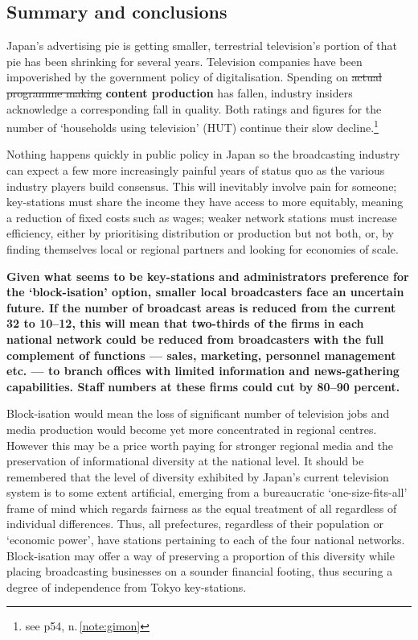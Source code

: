\documentclass[11pt, oneside, a4paper, headsepline]{scrartcl}
\begin{document}
\subsection{Summary and conclusions}

Japan's advertising pie is getting smaller, terrestrial television's portion of that pie has been shrinking for several years. Television companies have been impoverished by the government policy of digitalisation. Spending on \st{actual programme making} \textbf{content production} has fallen, industry insiders acknowledge a corresponding fall in quality. Both ratings and figures for the number of `households using television' (HUT) continue their slow decline.\footnote{see p54, n.\,\ref{note:gimon}} 

Nothing happens quickly in public policy in Japan so the broadcasting industry can expect a few more increasingly painful years of status quo as the various industry players build consensus. This will inevitably involve pain for someone; key-stations must share the income they have access to more equitably, meaning a reduction of fixed costs such as wages; weaker network stations must increase efficiency, either by prioritising distribution or production but not both, or, by finding themselves local or regional partners and looking for economies of scale.

{\bf Given what seems to be key-stations and administrators preference for the `block-isation' option, smaller local broadcasters face an uncertain future. If the number of broadcast areas is reduced from the current 32 to 10--12, this will mean that two-thirds of the firms in each national network could be reduced from broadcasters with the full complement of functions --- sales, marketing, personnel management etc. --- to branch offices with limited information and news-gathering capabilities. Staff numbers at these firms could cut by 80--90 percent.

Block-isation would mean the loss of significant number of television jobs and media production would become yet more concentrated in regional centres. However this may be a price worth paying for stronger regional media and the preservation of informational diversity at the national level. It should be remembered that the level of diversity exhibited by Japan's current television system is to some extent artificial, emerging from a bureaucratic `one-size-fits-all' frame of mind which regards fairness as the equal treatment of all regardless of individual differences. Thus, all prefectures, regardless of their population or `economic power', have stations pertaining to each of the four national networks. Block-isation may offer a way of preserving a proportion of this diversity while placing broadcasting businesses on a sounder financial footing, thus securing a degree of independence from Tokyo key-stations.
}
\end{document}
